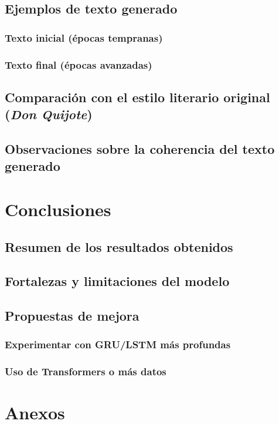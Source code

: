 \documentclass{article}
\begin{document}
\subsection{Ejemplos de texto generado}
\subsubsection{Texto inicial (épocas tempranas)}
\subsubsection{Texto final (épocas avanzadas)}
\subsection{Comparación con el estilo literario original (\textit{Don Quijote})}
\subsection{Observaciones sobre la coherencia del texto generado}

\newpage

\section{Conclusiones}
\subsection{Resumen de los resultados obtenidos}
\subsection{Fortalezas y limitaciones del modelo}
\subsection{Propuestas de mejora}
\subsubsection{Experimentar con GRU/LSTM más profundas}
\subsubsection{Uso de Transformers o más datos}

\section{Anexos}
\end{document}

